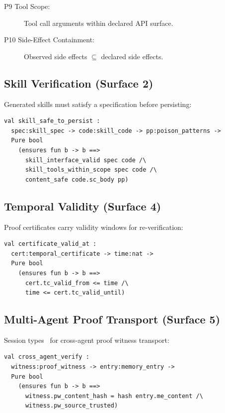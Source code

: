 \documentclass[sigplan,screen,nonacm]{acmart}
\begin{document}
\begin{description}
  \item[P9 Tool Scope:] Tool call arguments within declared API surface.
  \item[P10 Side-Effect Containment:] Observed side effects $\subseteq$
    declared side effects.
\end{description}

\subsection{Skill Verification (Surface 2)}

Generated skills must satisfy a specification before persisting:

\begin{lstlisting}[language=fstar,caption={Skill safety predicate composing interface, scope, and content checks.},label={lst:skill}]
val skill_safe_to_persist :
  spec:skill_spec -> code:skill_code -> pp:poison_patterns ->
  Pure bool
    (ensures fun b -> b ==>
      skill_interface_valid spec code /\
      skill_tools_within_scope spec code /\
      content_safe code.sc_body pp)
\end{lstlisting}

\subsection{Temporal Validity (Surface 4)}

Proof certificates carry validity windows for re-verification:

\begin{lstlisting}[language=fstar,caption={Temporal validity: certificates expire and must be re-verified.},label={lst:temporal}]
val certificate_valid_at :
  cert:temporal_certificate -> time:nat ->
  Pure bool
    (ensures fun b -> b ==>
      cert.tc_valid_from <= time /\
      time <= cert.tc_valid_until)
\end{lstlisting}

\subsection{Multi-Agent Proof Transport (Surface 5)}

Session types~\cite{gay2026session} for cross-agent proof witness transport:

\begin{lstlisting}[language=fstar,caption={Cross-agent verification: Agent B verifies Agent A's proof witness.},label={lst:witness}]
val cross_agent_verify :
  witness:proof_witness -> entry:memory_entry ->
  Pure bool
    (ensures fun b -> b ==>
      witness.pw_content_hash = hash entry.me_content /\
      witness.pw_source_trusted)
\end{lstlisting}
\end{document}
